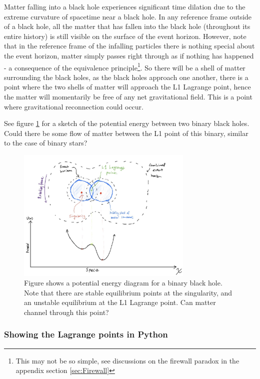 \documentclass{article}
\begin{document}
Matter falling into a black hole experiences significant time dilation due to the extreme curvature of spacetime near a black hole. In any reference frame outside of a black hole, all the matter that has fallen into the black hole (throughout its entire history) is still visible on the surface of the event horizon. However, note that in the reference frame of the infalling particles there is nothing special about the event horizon, matter simply passes right through as if nothing has happened - a consequence of the equivalence principle\footnote{This may not be so simple, see discussions on the firewall paradox in the appendix section \ref{sec:Firewall}}. So there will be a shell of matter surrounding the black holes, as the black holes approach one another, there is a point where the two shells of matter will approach the L1 Lagrange point, hence the matter will momentarily be free of any net gravitational field. This is a point where gravitational reconnection could occur. 

See figure \ref{fig:PE diagram of BBH} for a sketch of the potential energy between two binary black holes. Could there be some flow of matter between the L1 point of this binary, similar to the case of binary stars?

\begin{figure}
    \centering
    \includegraphics[width=0.75\textwidth]{images/L1_PE.jpeg}
    \caption{Figure shows a potential energy diagram for a binary black hole. Note that there are stable equilibrium points at the singularity, and an unstable equilibrium at the L1 Lagrange point. Can matter channel through this point?}
    \label{fig:PE diagram of BBH}
\end{figure}

\subsubsection{Showing the Lagrange points in Python}
\end{document}
